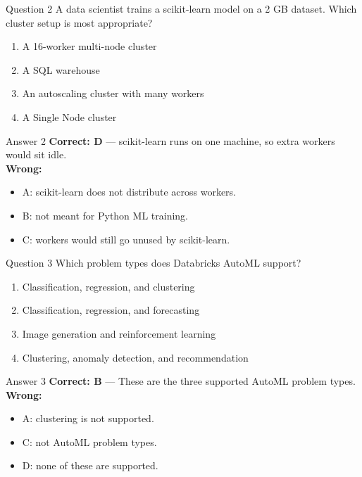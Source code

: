 \documentclass[aspectratio=169,11pt]{beamer}
\begin{document}
	\begin{frame}{Question 2}
		A data scientist trains a scikit-learn model on a 2 GB dataset. Which cluster setup is most appropriate?
		\begin{enumerate}[label=\Alph*.]
			\item A 16-worker multi-node cluster
			\item A SQL warehouse
			\item An autoscaling cluster with many workers
			\item A Single Node cluster
		\end{enumerate}
	\end{frame}
	\begin{frame}{Answer 2}
		\textbf{Correct: D} --- scikit-learn runs on one machine, so extra workers would sit idle.\\
		\vspace{0.5em}
		\textbf{Wrong:}
		\begin{itemize}
			\item A: scikit-learn does not distribute across workers.
			\item B: not meant for Python ML training.
			\item C: workers would still go unused by scikit-learn.
		\end{itemize}
	\end{frame}
	
	\begin{frame}{Question 3}
		Which problem types does Databricks AutoML support?
		\begin{enumerate}[label=\Alph*.]
			\item Classification, regression, and clustering
			\item Classification, regression, and forecasting
			\item Image generation and reinforcement learning
			\item Clustering, anomaly detection, and recommendation
		\end{enumerate}
	\end{frame}
	\begin{frame}{Answer 3}
		\textbf{Correct: B} --- These are the three supported AutoML problem types.\\
		\vspace{0.5em}
		\textbf{Wrong:}
		\begin{itemize}
			\item A: clustering is not supported.
			\item C: not AutoML problem types.
			\item D: none of these are supported.
		\end{itemize}
	\end{frame}
	
\end{document}
